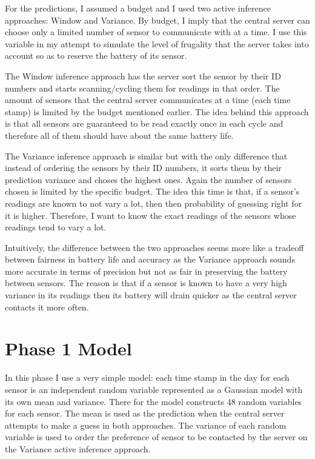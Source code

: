 \documentclass{article}
\begin{document}
For the predictions, I assumed a budget and I used two active
inference approaches: Window and Variance. By budget, I imply
that the central server can choose only a limited number
of sensor to communicate with at a time. I use this variable
in my attempt to simulate the level of frugality that the
server takes into account so as to reserve the battery of
its sensor.

The Window inference approach has the server sort the
sensor by their ID numbers and starts scanning/cycling them
for readings in that order. The amount of sensors that
the central server communicates at a time (each time stamp)
is limited by the budget mentioned earlier. The idea
behind this approach is that all sensors are guaranteed
to be read exactly once in each cycle and therefore
all of them should have about the same battery life.

The Variance inference approach is similar but with the
only difference that instead of ordering the sensors by
their ID numbers, it sorts them by their prediction variance
and choses the highest ones. Again the number of sensors
chosen is limited by the specific budget. The idea this
time is that, if a sensor's readings are known to not
vary a lot, then then probability of guessing right for
it is higher. Therefore, I want to know the exact readings
of the sensors whose readings tend to vary a lot.

Intuitively, the difference between the two approaches
seems more like a tradeoff between fairness in battery
life and accuracy as the Variance approach sounds more
accurate in terms of precision but not as fair in
preserving the battery between sensors. The reason is
that if a sensor is known to have a very high variance
in its readings then its battery will drain quicker as
the central server contacts it more often.

\section{Phase 1 Model}

In this phase I use a very simple model: each time
stamp in the day for each sensor is an independent
random variable represented as a Gaussian model with
its own mean and variance. There for the model
constructs 48 random variables for each sensor.
The mean is used as the prediction when the central
server attempts to make a guess in both approaches.
The variance of each random variable is used
to order the preference of sensor to be contacted
by the server on the Variance active inference
approach.
\end{document}

